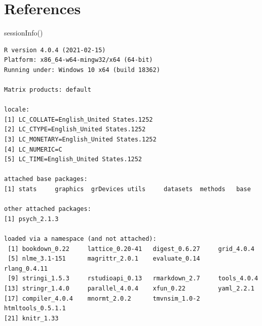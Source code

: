 \documentclass[
  english,
]{book}
\newenvironment{Shaded}{\begin{snugshade}}{\end{snugshade}}
\newcommand{\FunctionTok}[1]{\textcolor[rgb]{0.00,0.00,0.00}{#1}}
\newcommand{\NormalTok}[1]{#1}
\begin{document}
\hypertarget{references}{%
\chapter{References}\label{references}}

\begin{Shaded}
\begin{Highlighting}[]
\FunctionTok{sessionInfo}\NormalTok{()}
\end{Highlighting}
\end{Shaded}

\begin{verbatim}
R version 4.0.4 (2021-02-15)
Platform: x86_64-w64-mingw32/x64 (64-bit)
Running under: Windows 10 x64 (build 18362)

Matrix products: default

locale:
[1] LC_COLLATE=English_United States.1252 
[2] LC_CTYPE=English_United States.1252   
[3] LC_MONETARY=English_United States.1252
[4] LC_NUMERIC=C                          
[5] LC_TIME=English_United States.1252    

attached base packages:
[1] stats     graphics  grDevices utils     datasets  methods   base     

other attached packages:
[1] psych_2.1.3

loaded via a namespace (and not attached):
 [1] bookdown_0.22     lattice_0.20-41   digest_0.6.27     grid_4.0.4       
 [5] nlme_3.1-151      magrittr_2.0.1    evaluate_0.14     rlang_0.4.11     
 [9] stringi_1.5.3     rstudioapi_0.13   rmarkdown_2.7     tools_4.0.4      
[13] stringr_1.4.0     parallel_4.0.4    xfun_0.22         yaml_2.2.1       
[17] compiler_4.0.4    mnormt_2.0.2      tmvnsim_1.0-2     htmltools_0.5.1.1
[21] knitr_1.33       
\end{verbatim}

  
\end{document}
